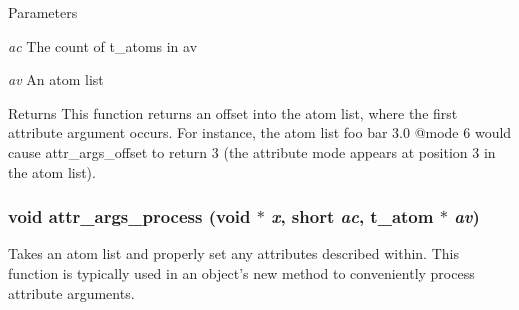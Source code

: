 \begin{DoxyParams}{Parameters}
\item[{\em ac}]The count of t\_\-atoms in {\ttfamily av} \item[{\em av}]An atom list\end{DoxyParams}
\begin{DoxyReturn}{Returns}
This function returns an offset into the atom list, where the first attribute argument occurs. For instance, the atom list {\ttfamily foo bar 3.0 @mode 6} would cause {\ttfamily attr\_\-args\_\-offset} to return 3 (the attribute {\ttfamily mode} appears at position 3 in the atom list). 
\end{DoxyReturn}
\hypertarget{group__attr_ga6818c20859f69d6c4acd289e07340db1}{
\subsubsection[{attr\_\-args\_\-process}]{\setlength{\rightskip}{0pt plus 5cm}void attr\_\-args\_\-process (void $\ast$ {\em x}, \/  short {\em ac}, \/  {\bf t\_\-atom} $\ast$ {\em av})}}
\label{group__attr_ga6818c20859f69d6c4acd289e07340db1}


Takes an atom list and properly set any attributes described within. This function is typically used in an object's {\ttfamily new} method to conveniently process attribute arguments.


